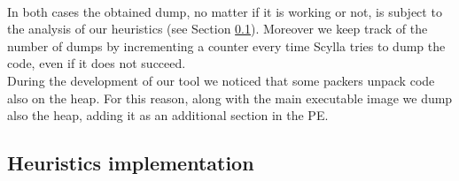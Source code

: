 \paragraph{}
In both cases the obtained dump, no matter if it is working or not, is subject to the analysis of our heuristics (see Section \ref{Heuristics implementation}). Moreover we keep track of the number of dumps by incrementing a counter every time Scylla tries to dump the code, even if it does not succeed.\\
During the development of our tool we noticed that some packers unpack code also on the heap. For this reason, along with the main executable image we dump also the heap, adding it as an additional section in the \ac{PE}.

\subsection{Heuristics implementation}
\label{Heuristics implementation}
